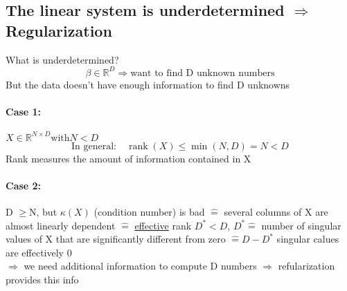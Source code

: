 \documentclass[11pt]{article}
\DeclareMathOperator{\rank}{rank}
\begin{document}
\begin{itemize}
    \subsection{The linear system is underdetermined $\Rightarrow$ Regularization}
    What is underdetermined?
    \begin{equation*}
      \beta \in \mathbb{R}^D \Rightarrow \text{want to find D unknown numbers}
    \end{equation*}
    But the data doesn't have enough information to find D unknowns
    \paragraph{Case 1:} $X \in \mathbb{R}^{N\times D} \text{with} N<D$
    \begin{equation*}
      \text{In general:} \quad \rank(X) \leq \min(N,D)=N<D
    \end{equation*}
    Rank measures the amount of information contained in X
    \paragraph{Case 2:} D $\geq$N, but $\kappa(X)$ (condition number) is bad
    $\widehat{=}$ several columns of X are almost linearly dependent $\widehat{=}
    $ \underline{effective} rank $D^* <D$, $D^* \widehat{=}$ number of singular
    values of X that are significantly different from zero $\widehat{=}D-D^*$
    singular calues are effectively 0 \\
    $\Rightarrow$ we need additional information to compute D numbers $\Rightarrow$
    refularization provides this info

\end{itemize}
\end{document}
